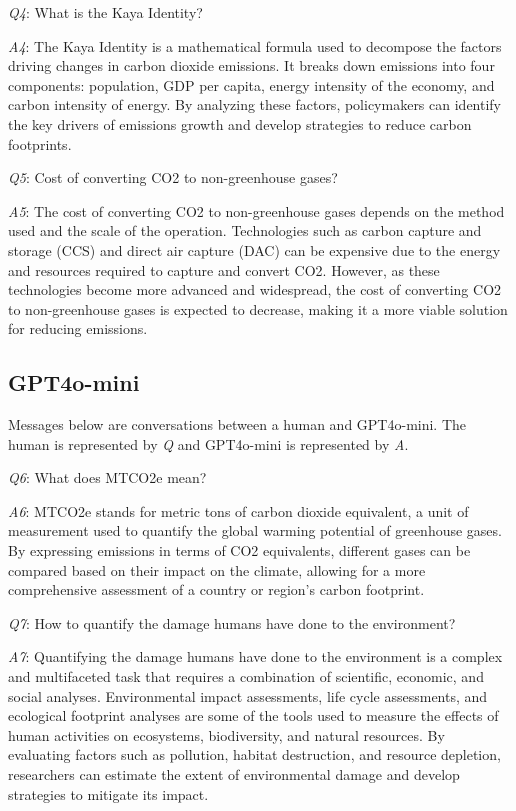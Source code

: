 \vspace{0.5cm}

\textit{Q4}: What is the Kaya Identity?

\textit{A4}: The Kaya Identity is a mathematical formula used to decompose the factors driving changes in carbon dioxide emissions. It breaks down emissions into four components: population, GDP per capita, energy intensity of the economy, and carbon intensity of energy. By analyzing these factors, policymakers can identify the key drivers of emissions growth and develop strategies to reduce carbon footprints.

\vspace{0.5cm}

\textit{Q5}: Cost of converting CO2 to non-greenhouse gases?

\textit{A5}: The cost of converting CO2 to non-greenhouse gases depends on the method used and the scale of the operation. Technologies such as carbon capture and storage (CCS) and direct air capture (DAC) can be expensive due to the energy and resources required to capture and convert CO2. However, as these technologies become more advanced and widespread, the cost of converting CO2 to non-greenhouse gases is expected to decrease, making it a more viable solution for reducing emissions.

\subsection*{GPT4o-mini}

Messages below are conversations between a human and GPT4o-mini. The human is represented by \textit{Q} and 
GPT4o-mini is represented by \textit{A}.
\vspace{0.5cm}

\textit{Q6}: What does MTCO2e mean?

\textit{A6}: MTCO2e stands for metric tons of carbon dioxide equivalent, a unit of measurement used to quantify the global warming potential of greenhouse gases. By expressing emissions in terms of CO2 equivalents, different gases can be compared based on their impact on the climate, allowing for a more comprehensive assessment of a country or region’s carbon footprint.

\vspace{0.5cm}

\textit{Q7}: How to quantify the damage humans have done to the environment?

\textit{A7}: Quantifying the damage humans have done to the environment is a complex and multifaceted task that requires a combination of scientific, economic, and social analyses. Environmental impact assessments, life cycle assessments, and ecological footprint analyses are some of the tools used to measure the effects of human activities on ecosystems, biodiversity, and natural resources. By evaluating factors such as pollution, habitat destruction, and resource depletion, researchers can estimate the extent of environmental damage and develop strategies to mitigate its impact.